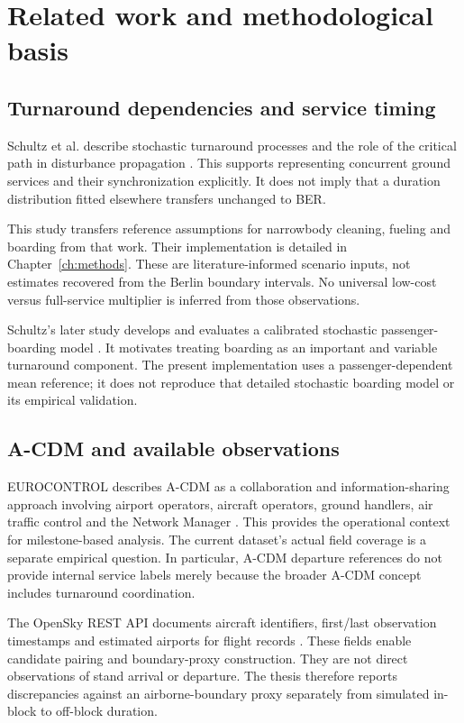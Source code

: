 \chapter{Related work and methodological basis}
\label{ch:related}

\section{Turnaround dependencies and service timing}
Schultz et al. describe stochastic turnaround processes and the role of the critical path in disturbance propagation \cite{schultz2012dynamic}. This supports representing concurrent ground services and their synchronization explicitly. It does not imply that a duration distribution fitted elsewhere transfers unchanged to BER.

This study transfers reference assumptions for narrowbody cleaning, fueling and boarding from that work. Their implementation is detailed in Chapter~\ref{ch:methods}. These are literature-informed scenario inputs, not estimates recovered from the Berlin boundary intervals. No universal low-cost versus full-service multiplier is inferred from those observations.

Schultz's later study develops and evaluates a calibrated stochastic passenger-boarding model \cite{schultz2018boarding}. It motivates treating boarding as an important and variable turnaround component. The present implementation uses a passenger-dependent mean reference; it does not reproduce that detailed stochastic boarding model or its empirical validation.

\section{A-CDM and available observations}
EUROCONTROL describes A-CDM as a collaboration and information-sharing approach involving airport operators, aircraft operators, ground handlers, air traffic control and the Network Manager \cite{eurocontrol_acdm}. This provides the operational context for milestone-based analysis. The current dataset's actual field coverage is a separate empirical question. In particular, A-CDM departure references do not provide internal service labels merely because the broader A-CDM concept includes turnaround coordination.

The OpenSky REST API documents aircraft identifiers, first/last observation timestamps and estimated airports for flight records \cite{opensky_rest}. These fields enable candidate pairing and boundary-proxy construction. They are not direct observations of stand arrival or departure. The thesis therefore reports discrepancies against an airborne-boundary proxy separately from simulated in-block to off-block duration.

